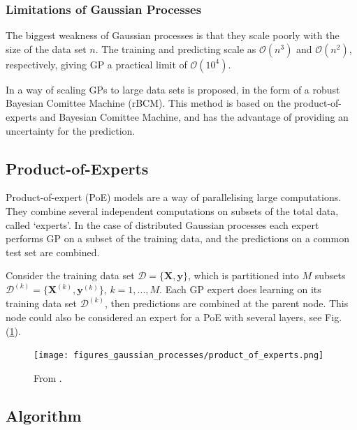 \documentclass[twoside,english]{uiofysmaster}
\begin{document}
\subsubsection{Limitations of Gaussian Processes}

The biggest weakness of Gaussian processes is that they scale poorly with the size of the data set $n$. The training and predicting scale as $\mathcal{O}(n^3)$ and $\mathcal{O}(n^2)$, respectively, giving GP a practical limit of $\mathcal{O}(10^4)$.

In \cite{deisenroth2015distributed} a way of scaling GPs to large data sets is proposed, in the form of a robust Bayesian Comittee Machine (rBCM). This method is based on the product-of-experts and Bayesian Comittee Machine, and has the advantage of providing an uncertainty for the prediction.


\subsection{Product-of-Experts}

Product-of-expert (PoE) models are a way of parallelising large computations. They combine several independent computations on subsets of the total data, called `experts'. In the case of distributed Gaussian processes each expert performs GP on a subset of the training data, and the predictions on a common test set are combined.

Consider the training data set $\mathcal{D} = \{ \textbf{X}, \textbf{y}\}$, which is partitioned into $M$ subsets $\mathcal{D}^{(k)} = \{\textbf{X}^{(k)}, \textbf{y}^{(k)} \}$, $k = 1,...,M$. Each GP expert does learning on its training data set $\mathcal{D}^{(k)}$, then predictions are combined at the parent node. This node could also be considered an expert for a PoE with several layers, see Fig. (\ref{Fig:: gaussian process : DGP illustration of layers}). 

\begin{figure}
\centering
\texttt{[image: figures\_gaussian\_processes/product\_of\_experts.png]}
\caption{From \cite{deisenroth2015distributed}.}
\label{Fig:: gaussian process : DGP illustration of layers}
\end{figure}

\subsection{Algorithm}
\end{document}
